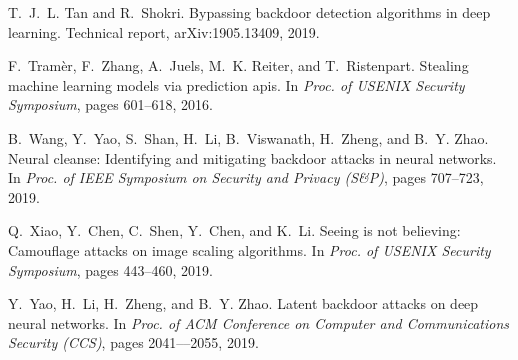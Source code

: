 \documentclass[conference]{IEEEtran}
\begin{document}
{\begin{thebibliography}{21}
	T.~J.~L. Tan and R.~Shokri.
	\newblock Bypassing backdoor detection algorithms in deep learning.
	\newblock Technical report, arXiv:1905.13409, 2019.
	
	F.~Tram{\`e}r, F.~Zhang, A.~Juels, M.~K. Reiter, and T.~Ristenpart.
	\newblock Stealing machine learning models via prediction apis.
	\newblock In \emph{Proc. of {USENIX} Security Symposium}, pages 
	601--618, 2016.
	
	B.~Wang, Y.~Yao, S.~Shan, H.~Li, B.~Viswanath, H.~Zheng, and B.~Y. 
	Zhao.
	\newblock Neural cleanse: Identifying and mitigating backdoor 
	attacks in neural
	networks.
	\newblock In \emph{Proc. of {IEEE} Symposium on Security and 
	Privacy ({S\&P})},
	pages 707--723, 2019.
	
	Q.~Xiao, Y.~Chen, C.~Shen, Y.~Chen, and K.~Li.
	\newblock Seeing is not believing: Camouflage attacks on image 
	scaling
	algorithms.
	\newblock In \emph{Proc. of {USENIX} Security Symposium}, pages 
	443--460, 2019.
	
	Y.~Yao, H.~Li, H.~Zheng, and B.~Y. Zhao.
	\newblock Latent backdoor attacks on deep neural networks.
	\newblock In \emph{Proc. of {ACM} Conference on Computer and 
	Communications
		Security ({CCS})}, pages 2041–--2055, 2019.
	
\end{thebibliography}

}
\end{document}
